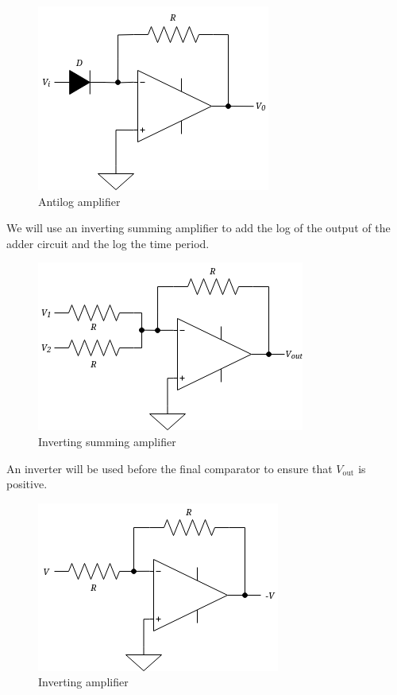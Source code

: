 \documentclass[a4paper, 12pt, oneside]{book}
\begin{document}
\begin{figure}[H]
  \centering
  \includegraphics[scale=0.5]{antilog.png}
  \caption{Antilog amplifier}
\end{figure}

We will use an inverting summing amplifier to add the log of the output of the adder circuit and the log the time period.

\begin{figure}[H]
  \centering
  \includegraphics[scale=0.5]{summing.png}
  \caption{Inverting summing amplifier}
\end{figure}

An inverter will be used before the final comparator to ensure that $V_{\text{out}}$ is positive.

\begin{figure}[H]
  \centering
  \includegraphics[scale=0.5]{inverter.png}
  \caption{Inverting amplifier}
\end{figure}
\end{document}
